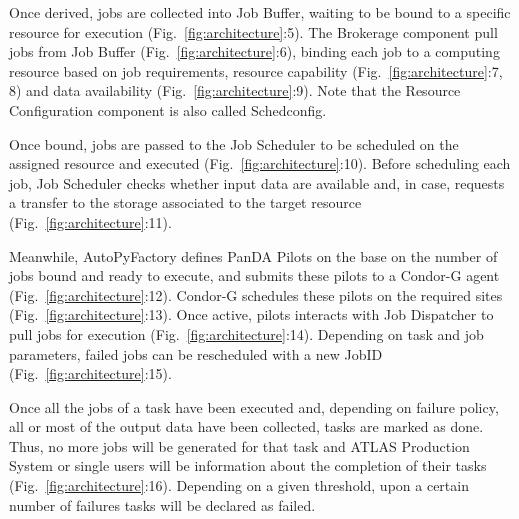 Once derived, jobs are collected into Job Buffer, waiting to be bound to a
specific resource for execution (Fig.~\ref{fig:architecture}:5). The
Brokerage component pull jobs from Job Buffer
(Fig.~\ref{fig:architecture}:6), binding each job to a computing resource
based on job requirements, resource capability
(Fig.~\ref{fig:architecture}:7, 8) and data availability
(Fig.~\ref{fig:architecture}:9). Note that the Resource Configuration
component is also called Schedconfig.

Once bound, jobs are passed to the Job Scheduler to be scheduled on the
assigned resource and executed (Fig.~\ref{fig:architecture}:10). Before
scheduling each job, Job Scheduler checks whether input data are available
and, in case, requests a transfer to the storage associated to the target
resource (Fig.~\ref{fig:architecture}:11).

Meanwhile, AutoPyFactory defines PanDA Pilots on the base on the number of
jobs bound and ready to execute, and submits these pilots to a Condor-G agent
(Fig.~\ref{fig:architecture}:12). Condor-G schedules these pilots on the
required sites (Fig.~\ref{fig:architecture}:13). Once active, pilots
interacts with Job Dispatcher to pull jobs for execution
(Fig.~\ref{fig:architecture}:14). Depending on task and job parameters,
failed jobs can be rescheduled with a new JobID
(Fig.~\ref{fig:architecture}:15).

Once all the jobs of a task have been executed and, depending on failure
policy, all or most of the output data have been collected, tasks are marked
as done. Thus, no more jobs will be generated for that task and ATLAS
Production System or single users will be information about the completion of
their tasks (Fig.~\ref{fig:architecture}:16). Depending on a given threshold,
upon a certain number of failures tasks will be declared as failed.



